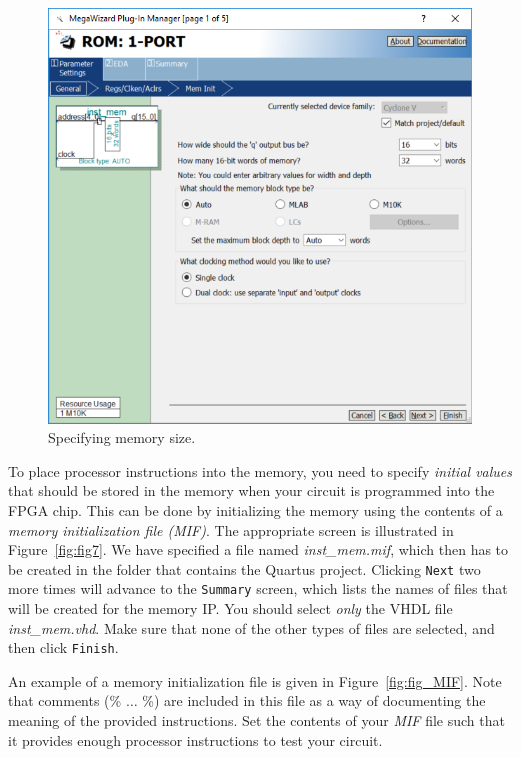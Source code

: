 \documentclass[epsfig,10pt,fullpage]{article}
\begin{document}
\begin{enumerate}
\begin{figure}[H]
	\begin{center}
		\includegraphics[scale=1.0]{figures/figure5.png}
	\end{center}
	\caption{{Specifying memory size.}}
	\label{fig:fig5}
\end{figure}

To place processor instructions into the memory, you need to specify {\it initial values}
that should be stored in the memory when your circuit is programmed into the FPGA chip.
This can be done by initializing the memory using the contents of a {\it memory initialization 
file (MIF)}. The appropriate screen is illustrated in Figure~\ref{fig:fig7}. We have specified 
a file named {\it inst\_mem.mif}, which then has to be created in the folder that 
contains the Quartus project. Clicking \texttt{Next} two more times will advance to the
\texttt{Summary} screen, which lists the names of files that will be created for the memory IP.
You should select {\it only} the VHDL file {\it inst\_mem.vhd}. Make sure that none of the 
other types of files are selected, and then click \texttt{Finish}.

An example of a memory initialization file is given in 
Figure~\ref{fig:fig_MIF}. Note that comments (\% $\ldots$ \%) are included in this file as a way of
documenting the meaning of the provided instructions.  Set the contents of
your {\it MIF} file such that it provides enough processor instructions to test your circuit.


\end{enumerate}
\end{document}
